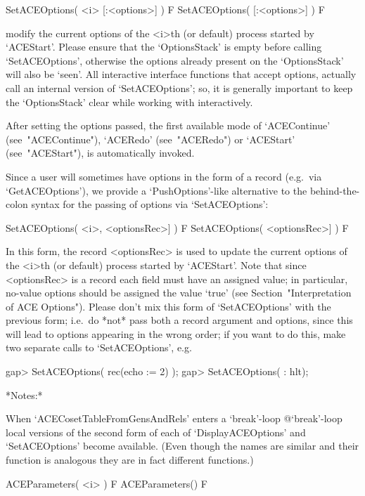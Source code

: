 \>SetACEOptions( <i> [:<options>] ) F
\>SetACEOptions( [:<options>] ) F

modify the current options of the <i>th (or default)  process  started
by `ACEStart'. Please ensure that the `OptionsStack' is  empty  before
calling `SetACEOptions', otherwise the options already present on  the
`OptionsStack'  will  also  be  \lq{}seen'.  All  interactive   {\ACE}
interface functions that accept options,  actually  call  an  internal
version of `SetACEOptions'; so, it is generally important to keep  the
`OptionsStack' clear while working with {\ACE} interactively.

After  setting  the  options  passed,  the  first  available  mode  of
`ACEContinue'  (see~"ACEContinue"),   `ACERedo'   (see~"ACERedo")   or
`ACEStart' (see~"ACEStart"), is automatically invoked.

Since a user will sometimes have options  in  the  form  of  a  record
(e.g.~via   `GetACEOptions'),   we   provide   a    `PushOptions'-like
alternative to the behind-the-colon syntax for the passing of  options
via `SetACEOptions':

\>SetACEOptions( <i>, <optionsRec>] ) F
\>SetACEOptions( <optionsRec>] ) F

In this form, the record <optionsRec> is used to  update  the  current
options of the <i>th (or default) process started by `ACEStart'.  Note
that since <optionsRec> is a record each field must have  an  assigned
value; in particular, no-value {\ACE} options should be  assigned  the
value `true' (see Section~"Interpretation  of  ACE  Options").  Please
don't mix this form of `SetACEOptions' with the previous form; i.e.~do
*not* pass both a record argument and options, since this will lead to
options appearing in the wrong order; if you want to do this, make two
separate calls to `SetACEOptions', e.g.

\beginexample
gap> SetACEOptions( rec(echo := 2) );
gap> SetACEOptions( : hlt);
\endexample

*Notes:*

When `ACECosetTableFromGensAndRels' enters a  `break'-loop{\undoquotes
{} {@`break'-loop}} local versions  of  the  second
form  of  each  of  `DisplayACEOptions'  and  `SetACEOptions'   become
available. (Even though the names are similar and  their  function  is
analogous they are in fact different functions.)

\>ACEParameters( <i> ) F
\>ACEParameters() F

